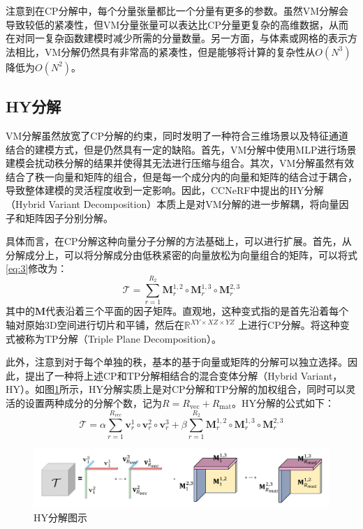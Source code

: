 \documentclass[10pt,twocolumn,letterpaper]{article}
\begin{document}
注意到在CP分解中，每个分量张量都比一个分量有更多的参数。虽然VM分解会导致较低的紧凑性，但VM分量张量可以表达比CP分量更复杂的高维数据，从而在对同一复杂函数建模时减少所需的分量数量。另一方面，与体素或网格的表示方法相比，VM分解仍然具有非常高的紧凑性，但是能够将计算的复杂性从$O(N^3)$降低为$O(N^2)$。


\subsection{HY分解}
\label{sec:hy}
VM分解虽然放宽了CP分解的约束，同时发明了一种符合三维场景以及特征通道结合的建模方式，但是仍然具有一定的缺陷。首先，VM分解中使用MLP进行场景建模会扰动秩分解的结果并使得其无法进行压缩与组合。其次，VM分解虽然有效结合了秩一向量和矩阵的组合，但是每一个成分内的向量和矩阵的结合过于耦合，导致整体建模的灵活程度收到一定影响。因此，CCNeRF\cite{tang2022ccnerf}中提出的HY分解（Hybrid Variant Decomposition）本质上是对VM分解的进一步解耦，将向量因子和矩阵因子分别分解。

具体而言，在CP分解这种向量分子分解的方法基础上，可以进行扩展。首先，从分解成分上，可以将分解成分由低秩紧密的向量放松为向量组合的矩阵，可以将式\ref{eq:3}修改为：
\begin{equation}
  \mathcal{T}=\sum_{r=1}^{R_{2}} \mathbf{M}_{r}^{1,2} \circ \mathbf{M}_{r}^{1,3} \circ \mathbf{M}_{r}^{2,3}
\end{equation}
\label{eq:5}
其中的$\mathbf M$代表沿着三个平面的因子矩阵。直观地，这种变式指的是首先沿着每个轴对原始3D空间进行切片和平铺，然后在$\mathbb R^{XY\times XZ\times YZ}$ 上进行CP分解。将这种变式被称为TP分解（Triple Plane Decomposition）。

此外，注意到对于每个单独的秩，基本的基于向量或矩阵的分解可以独立选择。因此，提出了一种将上述CP和TP分解相结合的混合变体分解（Hybrid Variant，HY）。如图\ref{fig:hy}所示，HY分解实质上是对CP分解和TP分解的加权组合，同时可以灵活的设置两种成分的分解个数，记为$R=R_{\text{vec}}+R_{\text{mat}}$。HY分解的公式如下：
\begin{equation}
  \mathcal{T}=\alpha\sum_{r=1}^{R_{vec}} \mathbf{v}_{r}^{1} \circ \mathbf{v}_{r}^{2} \circ \mathbf{v}_{r}^{3}+\beta\sum_{r=1}^{R_{2}} \mathbf{M}_{r}^{1,2} \circ \mathbf{M}_{r}^{1,3} \circ \mathbf{M}_{r}^{2,3}
\end{equation}
\label{eq:6}

\begin{figure}[h]
  \centering
  \includegraphics[width=1.0\linewidth]{fig/hy.png}
  \caption{HY分解图示}
  \label{fig:hy}
\end{figure}
\end{document}
